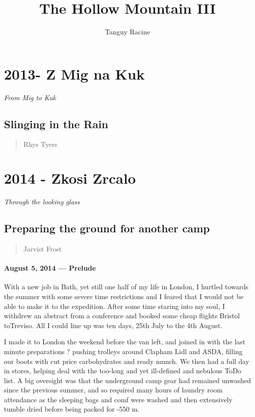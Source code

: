 \documentclass[onecolumn]{book}
\title{The Hollow Mountain III}
\author{Tanguy Racine}
\begin{document}
\maketitle

\chapter{2013- Z Mig na Kuk} 
\begin{flushright}
\huge \it From Mig to Kuk
\end{flushright}

\section{Slinging in the Rain}
 \begin{verse}
Rhys Tyers
\end{verse}

\chapter{2014 - Zkosi Zrcalo} 
\begin{flushright}
\huge \it Through the looking glass
\end{flushright}

\section{Preparing the ground for another camp}
\begin{verse}
Jarvist Frost
\end{verse}
\subsubsection{August 5, 2014 --- Prelude}
With a new job in Bath, yet still one half of my life in London, I hurtled towards the summer with some severe time restrictions and I feared that I would not be able to make it to the expedition. After some time staring into my soul, I withdrew an abstract from a conference and booked some cheap flights Bristol toTreviso. All I could line up was ten days, 25th July to the 4th August.

I made it to London the weekend before the van left, and joined in with the last minute preparations ? pushing trolleys around Clapham Lidl and ASDA, filling our boots with cut price carbohydrates and ready munch. We then had a full day in stores, helping deal with the too-long and yet ill-defined and nebulous ToDo list. A big oversight was that the underground camp gear had remained unwashed since the previous summer, and so required many hours of laundry room attendance as the sleeping bags and comf were washed and then extensively tumble dried before being packed for -550 m.
\end{document}
